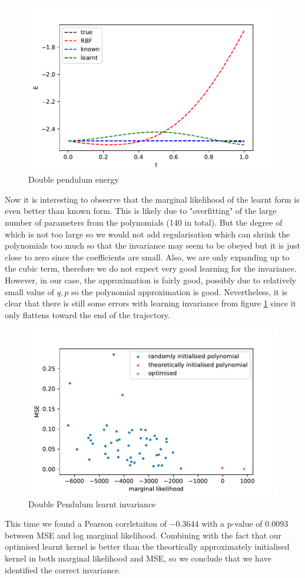\documentclass{statsmsc}
\begin{document}
\begin{figure}[H] 
  \includegraphics[width=0.8\linewidth]{../codes/figures/double_pendulum_energy.pdf}
  \centering
  \caption{Double pendulum energy}
  \label{fig:double_pendulum_energy}
\end{figure}
Now it is interesting to obsesrve that the marginal likelihood of the learnt form is even better than known form.
This is likely due to "overfitting" of the large number of parameters from the polynomials (140 in total).
But the degree of which is not too large so we would not add regularisation which can shrink the polynomials too much so that the invariance may seem to be obeyed but it is just close to zero since the coefficients are small.
Also, we are only expanding up to the cubic term, therefore we do not expect very good learning for the invariance.
However, in our case, the approximation is fairly good, possibly due to relatively small value of $q, p$ so the polynomial approximation is good.
Nevertheless, it is clear that there is still some errors with learning invariance from figure \ref{fig:double_pendulum_energy} since it only flattens toward the end of the trajectory.

\begin{figure}[H] 
  \includegraphics[width=0.8\linewidth]{../codes/figures/double_pendulum_polynomial.pdf}
  \centering
  \caption{Double Pendulum learnt invariance}
  \label{fig:double_pendulum_poly}
\end{figure}
This time we found a Pearson corrletaiton of $-0.3644$ with a p-value of $0.0093$ between MSE and log marginal likelihood.
Combining with the fact that our optimised learnt kernel is better than the theortically approximately initialised kernel in both marginal likelihood and MSE, so we conclude that we have identified the correct invariance.  
\end{document}
